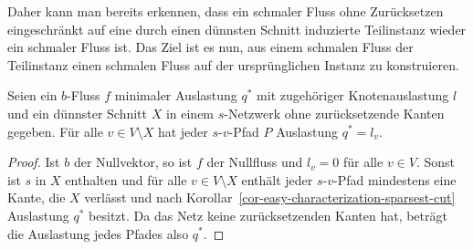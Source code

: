 Daher kann man bereits erkennen, dass ein schmaler Fluss ohne Zurücksetzen eingeschränkt auf eine durch einen dünnsten Schnitt induzierte Teilinstanz wieder ein schmaler Fluss ist.
Das Ziel ist es nun, aus einem schmalen Fluss der Teilinstanz einen schmalen Fluss auf der ursprünglichen Instanz zu konstruieren.

\begin{lemma}\label{lemma-flow-minimal-congestion-sparsest-cut-then-outside-X-congestion-q}
	Seien ein $b$-Fluss $f$ minimaler Auslastung $q^*$ mit zugehöriger Knotenauslastung $l$ und ein dünnster Schnitt $X$ in einem $s$-Netzwerk ohne zurücksetzende Kanten gegeben.
	Für alle $v\in V\setminus X$ hat jeder $s$-$v$-Pfad $P$ Auslastung $q^*=l_v$.
\end{lemma}
\begin{proof}
	Ist $b$ der Nullvektor, so ist $f$ der Nullfluss und $l_v = 0$ für alle $v\in V$.
	Sonst ist $s$ in $X$ enthalten und für alle $v\in V\setminus X$ enthält jeder $s$-$v$-Pfad mindestens eine Kante, die $X$ verlässt und nach Korollar~\ref{cor-easy-characterization-sparsest-cut} Auslastung $q^*$ besitzt.
	Da das Netz keine zurücksetzenden Kanten hat, beträgt die Auslastung jedes Pfades also $q^*$.
\end{proof}

